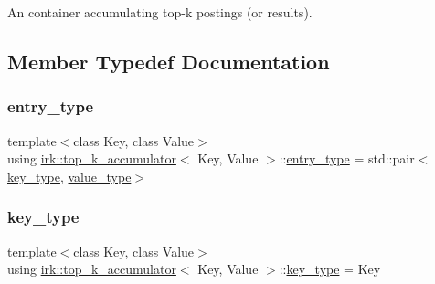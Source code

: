 An container accumulating top-\/k postings (or results). 

\subsection{Member Typedef Documentation}
\mbox{\label{classirk_1_1top__k__accumulator_a0eacc4cbf280b54983e25b9d34bd91c0}} 
\subsubsection{\texorpdfstring{entry\+\_\+type}{entry\_type}}
{\footnotesize\ttfamily template$<$class Key, class Value$>$ \\
using \mbox{\hyperlink{classirk_1_1top__k__accumulator}{irk\+::top\+\_\+k\+\_\+accumulator}}$<$ Key, Value $>$\+::\mbox{\hyperlink{classirk_1_1top__k__accumulator_a0eacc4cbf280b54983e25b9d34bd91c0}{entry\+\_\+type}} =  std\+::pair$<$\mbox{\hyperlink{classirk_1_1top__k__accumulator_a2476f5b995fe252f092590c05f48e61f}{key\+\_\+type}}, \mbox{\hyperlink{classirk_1_1top__k__accumulator_ad96657e9478dcbab995f3bf38954b5bd}{value\+\_\+type}}$>$}

\mbox{\label{classirk_1_1top__k__accumulator_a2476f5b995fe252f092590c05f48e61f}} 
\subsubsection{\texorpdfstring{key\+\_\+type}{key\_type}}
{\footnotesize\ttfamily template$<$class Key, class Value$>$ \\
using \mbox{\hyperlink{classirk_1_1top__k__accumulator}{irk\+::top\+\_\+k\+\_\+accumulator}}$<$ Key, Value $>$\+::\mbox{\hyperlink{classirk_1_1top__k__accumulator_a2476f5b995fe252f092590c05f48e61f}{key\+\_\+type}} =  Key}

\mbox{\label{classirk_1_1top__k__accumulator_ad96657e9478dcbab995f3bf38954b5bd}} 

